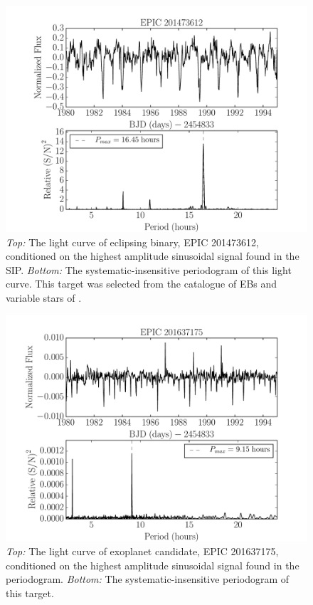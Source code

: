 \documentclass[useAMS, usenatbib, preprint, 12pt]{aastex}
\begin{document}
\begin{figure}
\begin{center}
\includegraphics[width=6in, clip=true]{EB_201473612.pdf}
\caption{{\it Top:} The light curve of eclipsing binary, EPIC 201473612,
	conditioned on the highest amplitude sinusoidal signal found in the
	SIP. {\it Bottom:} The systematic-insensitive periodogram of
	this light curve. This target was selected from the catalogue of EBs
	and variable stars of \citet{Armstrong2015}.}
\label{fig:EB}
\end{center}
\end{figure}

\begin{figure}
\begin{center}
\includegraphics[width=6in, clip=true]{planet_201637175.pdf}
\caption{{\it Top:} The light curve of exoplanet candidate, EPIC 201637175,
	conditioned on the highest amplitude sinusoidal signal found in the
	periodogram. {\it Bottom:} The systematic-insensitive periodogram of
	this target.}
\label{fig:planet}
\end{center}
\end{figure}



\end{document}
